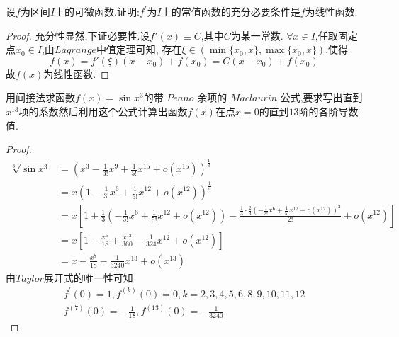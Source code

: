 \documentclass[lang=cn,newtx,10pt,scheme=chinese]{elegantbook}
\begin{document}
\begin{exercise}
    设\(f\)为区间\(I\)上的可微函数.证明:\(f^{\prime}\)为\(I\)上的常值函数的充分必要条件是\(f\)为线性函数.
    \begin{proof}
    充分性显然,下证必要性.设$f'(x)\equiv C$,其中$C$为某一常数.
    $\forall x\in I$,任取固定点$x_0\in I$,由$Lagrange$中值定理可知,
    存在$\xi\in(\min\{x_0,x\},\max\{x_0,x\})$,使得
    \begin{equation}
    f(x)=f'(\xi)(x-x_0)+f(x_0)=C(x-x_0)+f(x_0)
        \nonumber
    \end{equation}
    故$f(x)$为线性函数.

    \end{proof}
\end{exercise}

\begin{exercise}
    用间接法求函数\(f(x)=\sin x^3\)的带 $Peano$ 余项的 $Maclaurin$ 公式,要求写出直到\(x^{13}\)项的系数然后利用这个公式计算出函数\(f(x)\)在点\(x = 0\)的直到\(13\)阶的各阶导数值.
    \begin{proof}
        \begin{equation}
            \begin{split}
                \sqrt[3]{\sin x^3}&=\left( x^3-\frac{1}{3!}x^9+\frac{1}{5!}x^{15}+o\left( x^{15} \right) \right) ^{\frac{1}{3}}
\\
&=x\left( 1-\frac{1}{3!}x^6+\frac{1}{5!}x^{12}+o\left( x^{12} \right) \right) ^{\frac{1}{3}}
\\
&=x\left[ 1+\frac{1}{3}\left( -\frac{1}{3!}x^6+\frac{1}{5!}x^{12}+o\left( x^{12} \right) \right) -\frac{\frac{1}{3}\cdot \frac{2}{3}\left( -\frac{1}{3!}x^6+\frac{1}{5!}x^{12}+o\left( x^{12} \right) \right) ^2}{2!}+o\left( x^{12} \right) \right] 
\\
&=x\left[ 1-\frac{x^6}{18}+\frac{x^{12}}{360}-\frac{1}{324}x^{12}+o\left( x^{12} \right) \right]\\
&=x-\frac{x^7}{18}-\frac{1}{3240}x^{13}+o\left( x^{13} \right)
            \end{split}
            \nonumber
        \end{equation}
        由$Taylor$展开式的唯一性可知
        \begin{gather}
            f^{\prime}(0)=1,f^{(k)}(0)=0,k=2,3,4,5,6,8,9,10,11,12\nonumber\\
            f^{(7)}(0)=-\frac{1}{18},f^{(13)}(0)=-\frac{1}{3240}\nonumber
        \end{gather}
    \end{proof}
\end{exercise}
\end{document}
